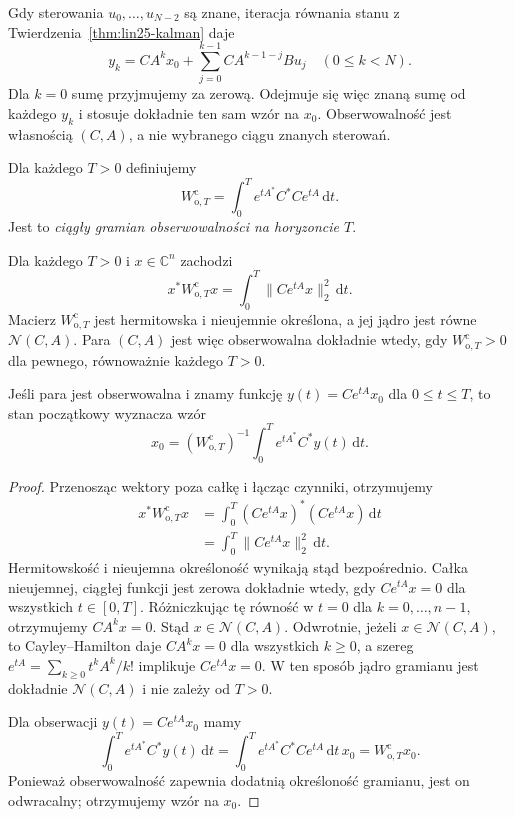 \begin{uwaga}
\label{rem:lin27-known-input}
Gdy sterowania \(u_0,\ldots,u_{N-2}\)
są znane, iteracja równania stanu
z
Twierdzenia~\ref{thm:lin25-kalman}
daje
\[
 y_k=CA^kx_0+
       \sum_{j=0}^{k-1}
             CA^{k-1-j}Bu_j
       \quad(0\le k<N).
\]
Dla \(k=0\) sumę przyjmujemy
za zerową. Odejmuje się więc
znaną sumę od każdego \(y_k\)
i stosuje dokładnie ten sam
wzór na \(x_0\).
Obserwowalność jest własnością
\((C,A)\), a nie wybranego
ciągu znanych sterowań.
\end{uwaga}

\begin{definicja}
\label{def:lin27-obs-cont}
Dla każdego \(T>0\)
definiujemy
\[
 W_{\mathrm o,T}^{\mathrm c}
 =\int_0^T
    e^{tA^*}C^*Ce^{tA}
   \,\mathrm dt.
\]
Jest to \emph{ciągły gramian
obserwowalności na horyzoncie \(T\)}.
\end{definicja}

\begin{twierdzenie}
\label{thm:lin27-cont-gramian}
Dla każdego \(T>0\)
i \(x\in\mathbb C^n\)
zachodzi
\[
 x^*W_{\mathrm o,T}^{\mathrm c}x
 =\int_0^T\|Ce^{tA}x\|_2^2
  \,\mathrm dt.
\]
Macierz
\(W_{\mathrm o,T}^{\mathrm c}\)
jest hermitowska i nieujemnie
określona, a jej jądro jest
równe \(\mathcal N(C,A)\).
Para \((C,A)\) jest więc
obserwowalna dokładnie wtedy,
gdy \(W_{\mathrm o,T}^{\mathrm c}>0\)
dla pewnego, równoważnie
każdego \(T>0\).

Jeśli para jest obserwowalna
i znamy funkcję
\(y(t)=Ce^{tA}x_0\)
dla \(0\le t\le T\),
to stan początkowy
wyznacza wzór
\[
 x_0=(W_{\mathrm o,T}^{\mathrm c})^{-1}
       \int_0^T e^{tA^*}C^*y(t)
       \,\mathrm dt.
\]
\end{twierdzenie}
\begin{proof}
Przenosząc wektory poza całkę
i łącząc czynniki,
otrzymujemy
\[
 \begin{aligned}
 x^*W_{\mathrm o,T}^{\mathrm c}x
 &=\int_0^T
    (Ce^{tA}x)^*(Ce^{tA}x)
    \,\mathrm dt\\
 &=\int_0^T\|Ce^{tA}x\|_2^2
    \,\mathrm dt.
 \end{aligned}
\]
Hermitowskość i nieujemna
określoność wynikają stąd
bezpośrednio. Całka nieujemnej,
ciągłej funkcji jest zerowa
dokładnie wtedy, gdy
\(Ce^{tA}x=0\)
dla wszystkich \(t\in[0,T]\).
Różniczkując tę równość
w \(t=0\) dla
\(k=0,\ldots,n-1\),
otrzymujemy
\(CA^kx=0\).
Stąd \(x\in\mathcal N(C,A)\).
Odwrotnie, jeżeli
\(x\in\mathcal N(C,A)\),
to Cayley--Hamilton daje
\(CA^kx=0\) dla wszystkich
\(k\ge0\), a szereg
\(e^{tA}=\sum_{k\ge0}t^kA^k/k!\)
implikuje \(Ce^{tA}x=0\).
W ten sposób jądro gramianu
jest dokładnie \(\mathcal N(C,A)\)
i nie zależy od \(T>0\).

Dla obserwacji
\(y(t)=Ce^{tA}x_0\)
mamy
\[
 \int_0^T e^{tA^*}C^*y(t)
   \,\mathrm dt
 =\int_0^T e^{tA^*}C^*Ce^{tA}
   \,\mathrm dt\, x_0
 =W_{\mathrm o,T}^{\mathrm c}x_0.
\]
Ponieważ obserwowalność
zapewnia dodatnią określoność
gramianu, jest on odwracalny;
otrzymujemy wzór na \(x_0\).
\end{proof}

